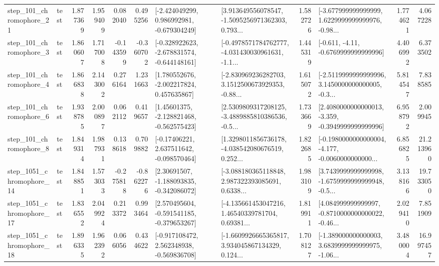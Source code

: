 \begin{tabular}{llrrrrllrlrr}
  step\_101\_chromophore\_21 &      test &      1.877369 &    1.959409 &      0.082040 &  0.495256 &   [-2.424049299, 0.986992981, -0.679304249] &  [3.913649556078547, -1.5095256971362303, 0.793... &       1.582726 &  [-3.677999999999999, 1.6229999999999976, -0.98... &            1.774621 &          4.067228 \\
   step\_101\_chromophore\_3 &      test &      1.860607 &    1.717008 &     -0.143599 & -0.360702 &  [-0.328922623, -2.678831574, -0.644148161] &  [-0.4978571784762777, -4.031430030961631, -1.1... &       1.445319 &               [-0.611, -4.11, -0.6769999999999996] &            4.406992 &          6.373502 \\
   step\_101\_chromophore\_4 &      test &      1.866838 &    2.143002 &      0.276164 &  1.231663 &    [1.780552676, -2.002217824, 0.457635867] &  [-2.830969236282703, 3.1512500673929353, -0.88... &       1.615072 &  [-2.5119999999999996, 3.1450000000000005, -0.3... &            5.814547 &          7.838585 \\
   step\_101\_chromophore\_6 &      test &      1.938785 &    2.000897 &      0.062112 &  0.419657 &    [1.45601375, -2.128821468, -0.562575423] &  [2.5309809317208125, -3.4889885810386536, -0.5... &       1.733669 &  [2.4080000000000013, -3.359, -0.3949999999999996] &            6.958792 &          2.009945 \\
   step\_101\_chromophore\_8 &      test &      1.849314 &    1.987931 &      0.138618 &  0.709882 &    [-0.17406221, 2.637511642, -0.098570464] &  [1.3298011856736178, -4.038542080676519, 0.252... &       1.822685 &  [-0.1980000000000004, -4.177, -0.0060000000000... &            6.856825 &         21.213960 \\
 step\_1051\_chromophore\_14 &      test &      1.848851 &    1.573033 &     -0.275818 & -0.862276 &    [2.30691507, -1.188093835, -0.342086072] &  [-3.088180365118848, 2.987322393085691, 0.6338... &       1.983109 &  [3.7439999999999998, -1.6759999999999948, -0.5... &            3.138166 &         19.733050 \\
 step\_1051\_chromophore\_17 &      test &      1.836552 &    2.049924 &      0.213372 &  0.993464 &   [2.570495604, -0.591541185, -0.379653267] &  [-4.135661453047216, 1.46540339781704, 0.69381... &       1.819911 &  [4.084999999999997, -0.8710000000000022, -0.46... &            2.029410 &          7.851909 \\
 step\_1051\_chromophore\_18 &      test &      1.896335 &    1.962392 &      0.066056 &  0.434622 &   [-0.917108472, 2.562348938, -0.569836708] &  [-1.6609926665365817, 3.934045867134329, 0.124... &       1.708127 &  [-1.389000000000003, 3.6839999999999975, -1.06... &            3.480004 &         16.997457 \\

\end{tabular}
